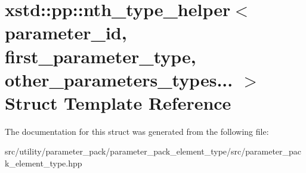 \hypertarget{structxstd_1_1pp_1_1nth__type__helper_3_01parameter__id_00_01first__parameter__type_00_01other__parameters__types_8_8_8_01_4}{\section{xstd\-:\-:pp\-:\-:nth\-\_\-type\-\_\-helper$<$ parameter\-\_\-id, first\-\_\-parameter\-\_\-type, other\-\_\-parameters\-\_\-types... $>$ Struct Template Reference}
\label{structxstd_1_1pp_1_1nth__type__helper_3_01parameter__id_00_01first__parameter__type_00_01other__parameters__types_8_8_8_01_4}
}


The documentation for this struct was generated from the following file\-:\begin{DoxyCompactItemize}
\item 
src/utility/parameter\-\_\-pack/parameter\-\_\-pack\-\_\-element\-\_\-type/src/parameter\-\_\-pack\-\_\-element\-\_\-type.\-hpp\end{DoxyCompactItemize}

